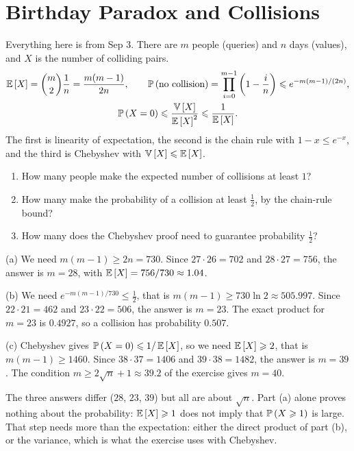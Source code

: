 \section{Birthday Paradox and Collisions}\label{sec:birthday}

Everything here is from Sep 3. There are $m$ people (queries) and $n$ days (values), and $X$ is the
number of colliding pairs.
\begin{gather*}
    \operatorname{\mathbb{E}}\left[X\right] = \binom{m}{2} \frac{1}{n} = \frac{m(m-1)}{2n},
    \qquad
    \operatorname{\mathbb{P}}\left(\text{no collision}\right) = \prod_{i=0}^{m-1} \left(1 - \frac{i}{n}\right) \leqslant e^{-m(m-1)/(2n)}, \\
    \operatorname{\mathbb{P}}\left(X = 0\right) \leqslant \frac{\operatorname{\mathbb{V}}\left[X\right]}{\operatorname{\mathbb{E}}\left[X\right]^2} \leqslant \frac{1}{\operatorname{\mathbb{E}}\left[X\right]}.
\end{gather*}
The first is linearity of expectation, the second is the chain rule with $1 - x \leq e^{-x}$, and
the third is Chebyshev with $\operatorname{\mathbb{V}}\left[X\right] \leqslant \operatorname{\mathbb{E}}\left[X\right]$.

\begin{exercisebox}
\begin{pproblem}[The numbers for $n = 365$]\label{pp:bday365}
    \leavevmode
    \begin{enumerate}[label=(\alph*)]
        \item How many people make the expected number of collisions at least $1$?
        \item How many make the probability of a collision at least $\frac{1}{2}$, by the chain-rule
              bound?
        \item How many does the Chebyshev proof need to guarantee probability $\frac{1}{2}$?
    \end{enumerate}
\end{pproblem}
\tcblower
\begin{wsolution}
    (a) We need $m(m-1) \geq 2n = 730$. Since $27 \cdot 26 = 702$ and $28 \cdot 27 = 756$, the
    answer is $m = 28$, with $\operatorname{\mathbb{E}}\left[X\right] = 756/730 \approx 1.04$.

    (b) We need $e^{-m(m-1)/730} \leq \frac{1}{2}$, that is $m(m-1) \geq 730 \ln 2 \approx 505.997$.
    Since $22 \cdot 21 = 462$ and $23 \cdot 22 = 506$, the answer is $m = 23$. The exact product for
    $m = 23$ is $0.4927$, so a collision has probability $0.507$.

    (c) Chebyshev gives $\operatorname{\mathbb{P}}\left(X = 0\right) \leqslant 1/\operatorname{\mathbb{E}}\left[X\right]$, so we need
    $\operatorname{\mathbb{E}}\left[X\right] \geqslant 2$, that is $m(m-1) \geq 1460$. Since $38 \cdot 37 = 1406$ and
    $39 \cdot 38 = 1482$, the answer is $m = 39$. The condition $m \geq 2\sqrt{n} + 1 \approx 39.2$
    of the exercise gives $m = 40$.

    The three answers differ ($28$, $23$, $39$) but all are about $\sqrt{n}$. Part (a) alone proves
    nothing about the probability: $\operatorname{\mathbb{E}}\left[X\right] \geqslant 1$ does not imply that
    $\operatorname{\mathbb{P}}\left(X \geqslant 1\right)$ is large. That step needs more than the expectation: either the direct
    product of part (b), or the variance, which is what the exercise uses with Chebyshev.
\end{wsolution}
\end{exercisebox}

